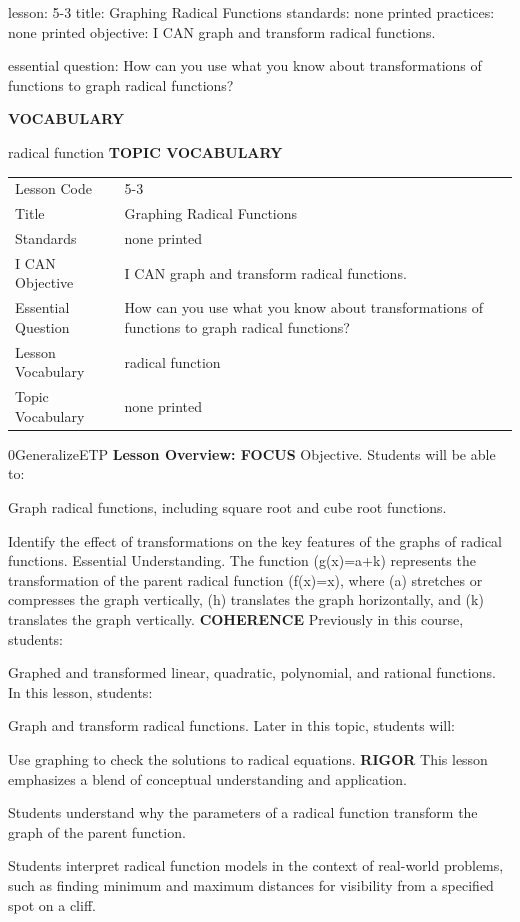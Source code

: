 \documentclass{article}
\newenvironment{lesson-meta}{}{}        %
\newenvironment{te-addendum}[2]{}{}     %
\newcommand{\te}[1]{}                   %
\begin{document}
\begin{lesson-meta}
lesson: 5-3
title: Graphing Radical Functions
standards: none printed
practices: none printed
objective: I CAN graph and transform radical functions.

essential question: How can you use what you know about transformations of functions to graph radical functions?

\textbf{VOCABULARY}
\item radical function
\textbf{TOPIC VOCABULARY}
\te{No topic vocabulary list is printed on these lesson pages.}
\begin{tabular}{ll}
Lesson Code & 5-3 \\
Title & Graphing Radical Functions \\
Standards & none printed \\
I CAN Objective & I CAN graph and transform radical functions. \\
Essential Question & How can you use what you know about transformations of functions to graph radical functions? \\
Lesson Vocabulary & radical function \\
Topic Vocabulary & none printed \\
\end{tabular}
\end{lesson-meta}
\begin{te-addendum}{0}{GeneralizeETP}
\textbf{Lesson Overview: FOCUS}
Objective. Students will be able to:
\item Graph radical functions, including square root and cube root functions.
\item Identify the effect of transformations on the key features of the graphs of radical functions.
Essential Understanding. The function (g(x)=a+k) represents the transformation of the parent radical function (f(x)=\sqrt[n]x), where (a) stretches or compresses the graph vertically, (h) translates the graph horizontally, and (k) translates the graph vertically.
\textbf{COHERENCE}
Previously in this course, students:
\item Graphed and transformed linear, quadratic, polynomial, and rational functions.
In this lesson, students:
\item Graph and transform radical functions.
Later in this topic, students will:
\item Use graphing to check the solutions to radical equations.
\textbf{RIGOR}
This lesson emphasizes a blend of conceptual understanding and application.
\item Students understand why the parameters of a radical function transform the graph of the parent function.
\item Students interpret radical function models in the context of real-world problems, such as finding minimum and maximum distances for visibility from a specified spot on a cliff.
\end{te-addendum}
\end{document}
